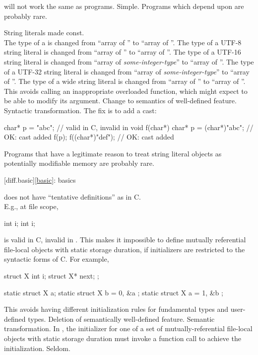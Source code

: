will not work the same as \Cpp{} programs.
\difficulty
Simple.
\howwide
Programs which depend upon  are probably rare.

\change
String literals made const.\\
The type of a  is changed
from ``array of ''
to ``array of ''.
The type of a UTF-8 string literal is changed
from ``array of ''
to ``array of ''.
The type of a UTF-16 string literal is changed
from ``array of \textit{some-integer-type}''
to ``array of ''.
The type of a UTF-32 string literal is changed
from ``array of \textit{some-integer-type}''
to ``array of ''.
The type of a wide string literal is changed
from ``array of ''
to ``array of ''.
\rationale
This avoids calling an inappropriate overloaded function,
which might expect to be able to modify its argument.
\effect
Change to semantics of well-defined feature.
\difficulty
Syntactic transformation. The fix is to add a cast:

\begin{codeblock}
char* p = "abc";                // valid in C, invalid in \Cpp{}
void f(char*) {
  char* p = (char*)"abc";       // OK: cast added
  f(p);
  f((char*)"def");              // OK: cast added
}
\end{codeblock}

\howwide
Programs that have a legitimate reason to treat string literal objects
as potentially modifiable memory are probably rare.

[diff.basic]{\ref{basic}: basics}

\change
\Cpp{} does not have ``tentative definitions'' as in C.\\
E.g., at file scope,
\begin{codeblock}
int i;
int i;
\end{codeblock}
is valid in C, invalid in \Cpp{}.
This makes it impossible to define
mutually referential file-local objects with static storage duration,
if initializers are restricted to the syntactic forms of C\@.
For example,
\begin{codeblock}
struct X { int i; struct X* next; };

static struct X a;
static struct X b = { 0, &a };
static struct X a = { 1, &b };
\end{codeblock}

\rationale
This avoids having different initialization rules for
fundamental types and user-defined types.
\effect
Deletion of semantically well-defined feature.
\difficulty
Semantic transformation.
In \Cpp{}, the initializer for one of a set of
mutually-referential file-local objects with static storage
duration must invoke a function
call to achieve the initialization.
\howwide
Seldom.

